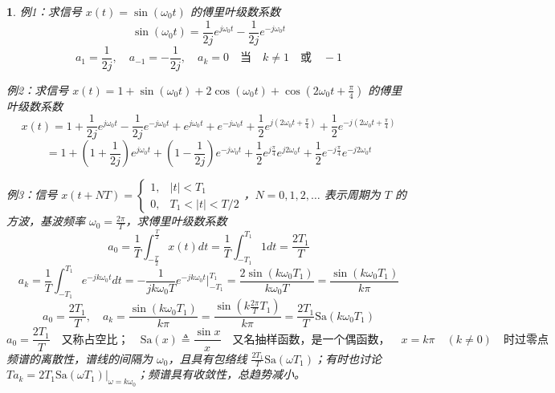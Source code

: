 \documentclass[UTF8]{report}
\theoremstyle{MyLineTheoremStyle} %
\theoremstyle{MyBlockTheoremStyle} %
\theoremstyle{MySubsubsectionStyle} %
\newtheorem{definition}{}
\begin{document}
\begin{definition}
    例1：求信号 $x(t) = \sin(\omega_0 t)$ 的傅里叶级数系数
    \[
    \sin(\omega_0 t) = \frac{1}{2j} e^{j\omega_0 t} - \frac{1}{2j} e^{-j\omega_0 t}
    \]
    \[
    a_1 = \frac{1}{2j}, \quad a_{-1} = -\frac{1}{2j}, \quad a_k = 0 \quad \text{当} \quad k \neq 1 \quad \text{或} \quad -1
    \]

    例2：求信号 $x(t) = 1 + \sin(\omega_0 t) + 2 \cos(\omega_0 t) + \cos(2\omega_0 t + \frac{\pi}{4})$ 的傅里叶级数系数
    \[
    x(t) = 1 + \frac{1}{2j} e^{j\omega_0 t} - \frac{1}{2j} e^{-j\omega_0 t} + e^{j\omega_0 t} + e^{-j\omega_0 t} + \frac{1}{2} e^{j(2\omega_0 t + \frac{\pi}{4})} + \frac{1}{2} e^{-j(2\omega_0 t + \frac{\pi}{4})}
    \]
    \[
    = 1 + \left(1 + \frac{1}{2j}\right) e^{j\omega_0 t} + \left(1 - \frac{1}{2j}\right) e^{-j\omega_0 t} + \frac{1}{2} e^{j\frac{\pi}{4}} e^{j2\omega_0 t} + \frac{1}{2} e^{-j\frac{\pi}{4}} e^{-j2\omega_0 t}
    \]

    例3：信号 $x(t + NT) = 
    \begin{cases} 
    1, & |t| < T_1 \\
    0, & T_1 < |t| < T/2 
    \end{cases}$，$N = 0,1,2, \ldots$ 表示周期为 $T$ 的方波，基波频率 $\omega_0 = \frac{2\pi}{T}$，求傅里叶级数系数
    \[
    a_0 = \frac{1}{T} \int_{-\frac{T}{2}}^{\frac{T}{2}} x(t) dt = \frac{1}{T} \int_{-T_1}^{T_1} 1 dt = \frac{2T_1}{T}
    \]
    \[
    a_k = \frac{1}{T} \int_{-T_1}^{T_1} e^{-jk\omega_0 t} dt = -\frac{1}{jk\omega_0 T} e^{-jk\omega_0 t} \Bigg|_{-T_1}^{T_1} = \frac{2 \sin(k\omega_0 T_1)}{k\omega_0 T} = \frac{ \sin(k\omega_0 T_1)}{k\pi}
    \]
    \[
    a_0 = \frac{2T_1}{T}, \quad a_k = \frac{\sin(k\omega_0 T_1)}{k\pi} = \frac{\sin(k\frac{2\pi}{T} T_1)}{k\pi} = \frac{2T_1}{T} \text{Sa}(k\omega_0 T_1)
    \]
    \[
    a_0 = \frac{2T_1}{T} \quad \text{又称占空比；} \quad \text{Sa}(x) \triangleq  \frac{\sin x}{x} \quad \text{又名抽样函数，是一个偶函数，} \quad x = k\pi \quad (k \neq 0) \quad \text{时过零点}
    \]
    频谱的离散性，谱线的间隔为 $\omega_0$，且具有包络线 $\frac{2T_1}{T} \text{Sa}(\omega T_1)$；有时也讨论 $T a_k = {2T_1 \text{Sa}(\omega T_1)}\Bigg|_{\omega = k\omega_0}$；频谱具有收敛性，总趋势减小。
\end{definition}
\end{document}
